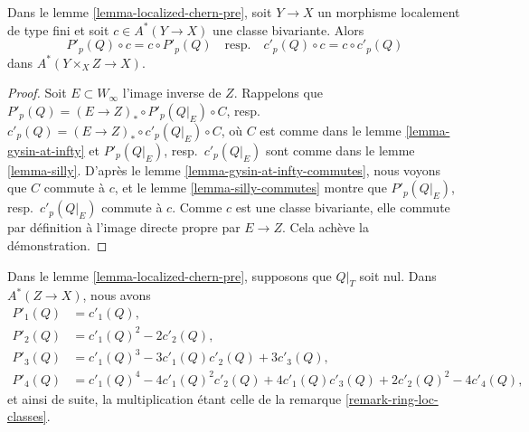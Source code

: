 \begin{lemma}
\label{lemma-homomorphism-commute}
Dans le lemme \ref{lemma-localized-chern-pre}, soit $Y \to X$ un morphisme
localement de type fini et soit $c \in A^*(Y \to X)$ une classe bivariante.
Alors
$$
P'_p(Q) \circ c = c \circ P'_p(Q)
\quad\text{resp.}\quad
c'_p(Q) \circ c = c \circ c'_p(Q)
$$
dans $A^*(Y \times_X Z \to X)$.
\end{lemma}

\begin{proof}
Soit $E \subset W_\infty$ l'image inverse de $Z$.
Rappelons que $P'_p(Q) = (E \to Z)_* \circ P'_p(Q|_E) \circ C$,
resp.\ $c'_p(Q) = (E \to Z)_* \circ c'_p(Q|_E) \circ C$,
où $C$ est comme dans le lemme \ref{lemma-gysin-at-infty} et
$P'_p(Q|_E)$, resp.\ $c'_p(Q|_E)$ sont comme dans le
lemme \ref{lemma-silly}.
D'après le lemme \ref{lemma-gysin-at-infty-commutes},
nous voyons que $C$ commute à $c$,
et le lemme \ref{lemma-silly-commutes} montre que
$P'_p(Q|_E)$, resp.\ $c'_p(Q|_E)$ commute à $c$.
Comme $c$ est une classe bivariante, elle commute par définition à l'image
directe propre par $E \to Z$. Cela achève la démonstration.
\end{proof}

\begin{lemma}
\label{lemma-localized-chern-pre-compose}
Dans le lemme \ref{lemma-localized-chern-pre}, supposons que $Q|_T$ soit nul. Dans
$A^*(Z \to X)$, nous avons
\begin{align*}
P'_1(Q) & = c'_1(Q), \\
P'_2(Q) & = c'_1(Q)^2 - 2c'_2(Q), \\
P'_3(Q) & = c'_1(Q)^3 - 3c'_1(Q)c'_2(Q) + 3c'_3(Q), \\
P'_4(Q) & = c'_1(Q)^4 - 4c'_1(Q)^2c'_2(Q) +
4c'_1(Q)c'_3(Q) + 2c'_2(Q)^2 - 4c'_4(Q),
\end{align*}
et ainsi de suite, la multiplication étant celle de la remarque \ref{remark-ring-loc-classes}.
\end{lemma}

